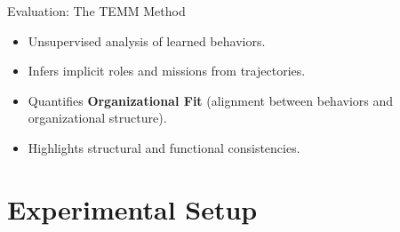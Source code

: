 \documentclass[9pt, aspectratio=169]{beamer}
\begin{document}
\begin{frame}{Evaluation: The TEMM Method}
  \begin{itemize}
    \item Unsupervised analysis of learned behaviors.
    \item Infers implicit roles and missions from trajectories.
    \item Quantifies \textbf{Organizational Fit} (alignment between behaviors and organizational structure).
    \item Highlights structural and functional consistencies.
  \end{itemize}
\end{frame}

\section{Experimental Setup}
\end{document}
